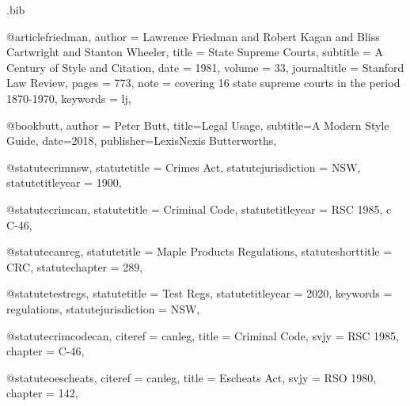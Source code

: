 \begin{filecontents*}{\jobname.bib}


@article{friedman,
author = {Lawrence Friedman and Robert Kagan and Bliss Cartwright and Stanton Wheeler},
title = {State Supreme Courts},
subtitle = {A Century of Style and Citation},
date = {1981},
volume = {33},
journaltitle = {Stanford Law Review},
pages = {773},
note = {covering 16 state supreme courts in the period 1870-1970},
keywords = {lj},
}



@book{butt,
author = {Peter Butt},
title={Legal Usage},
subtitle={A Modern Style Guide},
date={2018},
publisher={LexisNexis Butterworths},
}


@statute{crimnsw,
statutetitle = {Crimes Act},
statutejurisdiction = {NSW},
statutetitleyear = {1900},%
}


@statute{crimcan,
statutetitle = {Criminal Code},
statutetitleyear = {RSC 1985, c C-46},%
}


@statute{canreg,
statutetitle = {Maple Products Regulations},
statuteshorttitle = {CRC},
statutechapter = {289},
}

@statute{testregs,
statutetitle = {Test Regs},
statutetitleyear = {2020},%
keywords = {regulations},
statutejurisdiction = {NSW},
}




@statute{crimcodecan,
citeref = {canleg},
title = {Criminal Code},
svjy = {RSC 1985},
chapter = {C-46},
}


@statute{oescheats,
citeref = {canleg},
title = {Escheats Act},
svjy = {RSO 1980},
chapter = {142},
}


\end{filecontents*}
